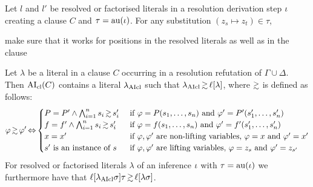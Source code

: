 \documentclass[,%
	draft=false,%
	numbers=noendperiod
	11pt,
	a4paper,
	oneside,%
	openany,
]{memoir}
\begin{document}
\begin{lemma}
	Let $l$ and $l'$ be resolved or factorised literals in a resolution derivation step $\iota$ creating a clause $C$ and 
	$\tau = \operatorname{au}(\iota)$.
	For any substitution $(z_s \mapsto z_t) \in \tau$, 





	make sure that it works for positions in the resolved literals as well as in the clause


\end{lemma}

\begin{lemma}
	\label{lemma:literals_clause_simgeq}
	Let $\lambda$ be a literal in a clause $C$ occurring in a resolution refutation of $\Gamma\cup\Delta$.
	Then $\operatorname{AI}_\mathrm{cl}(C)$ contains a literal $\lambda_{\operatorname{AIcl}}$ such that $\lambda\cl \simgeq \lifboth{\lambda}$, where $\simgeq$ is defined as follows:
	\[
		\varphi \simgeq \varphi' \semiff
		\begin{cases}
			P = P' \land \bigwedge_{i=1}^n s_i \simgeq s'_i &  \text{ if $\varphi = P(s_1, \dots, s_n)$ and $\varphi' = P'(s'_1, \dots, s'_n)$} \\
			f = f' \land \bigwedge_{i=1}^n s_i \simgeq s'_i &  \text{ if $\varphi = f(s_1, \dots, s_n)$ and $\varphi' = f'(s'_1, \dots, s'_n)$} \\
			x = x' & \text{ if $\varphi, \varphi'$ are non-lifting variables, $\varphi = x$ and $\varphi' = x'$} \\
			s' \text{ is an instance of } s  & \text{ if $\varphi, \varphi'$ are lifting variables, $\varphi = z_s$ and $\varphi' = z_{s'}$} \\
		\end{cases}
	\]
	For resolved or factorised literals $\lambda$ of an inference $\iota$ with $\tau = \operatorname{au}(\iota)$ we furthermore have that $\lifboth{\lambda\cl\sigma}\tau \simgeq \lifboth{\lambda\sigma}$.
\end{lemma}
\end{document}
